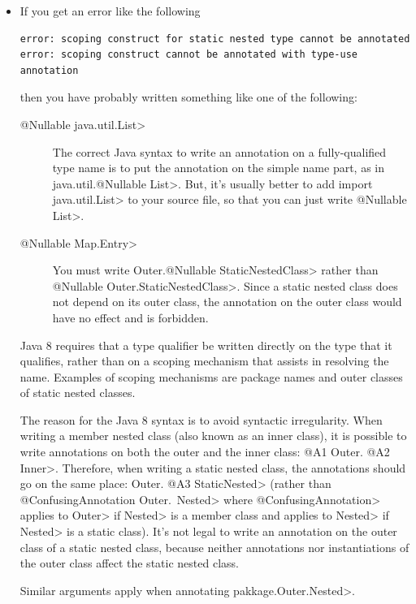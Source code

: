 \begin{itemize}

\item
If you get an error like the following

\begin{Verbatim}
error: scoping construct for static nested type cannot be annotated
error: scoping construct cannot be annotated with type-use annotation
\end{Verbatim}

\noindent
  then you have probably written something like one of the following:
\begin{description}
\item[\<@Nullable java.util.List>]
The correct Java syntax to write an annotation on a fully-qualified type
name is to put the annotation on the simple name part, as in
\<java.util.@Nullable List>.  But, it's usually
better to add \<import java.util.List> to your source file, so that you can
just write \<@Nullable List>.
\item[\<@Nullable Map.Entry>]  You must write \<Outer.@Nullable
StaticNestedClass> rather than \<@Nullable Outer.StaticNestedClass>.
Since a static nested class does not depend on its outer class, the
annotation on the outer class would have no effect and is forbidden.
\end{description}

Java 8 requires that a type qualifier be written directly on the type that
it qualifies, rather than on a scoping mechanism that assists in resolving
the name.  Examples of scoping mechanisms are package names and outer
classes of static nested classes.

The reason for the Java 8 syntax is to avoid syntactic irregularity.  When
writing a member nested class (also known as an inner class), it is
possible to write annotations on both the outer and the inner class:  \<@A1
Outer. @A2 Inner>.  Therefore, when writing a static nested class, the
annotations should go on the same place:  \<Outer. @A3 StaticNested> (rather
than \<@ConfusingAnnotation Outer.\ Nested> where
\<@ConfusingAnnotation> applies to \<Outer> if \<Nested> is a member class
and applies to \<Nested> if \<Nested> is a static class).  It's not legal
to write an annotation on the outer class of a static nested class, because
neither annotations nor instantiations of the outer class affect the static
nested class.

Similar arguments apply when annotating \<pakkage.Outer.Nested>.


\end{itemize}
